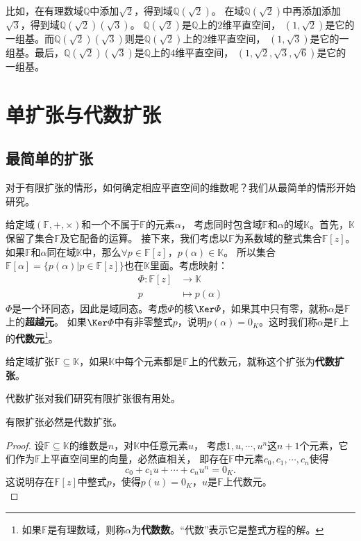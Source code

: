 \documentclass[12pt,UTF8]{ctexbook}
\begin{document}
\begin{appendix}
比如，在有理数域$\mathbb{Q}$中添加$\sqrt{2}$，得到域$\mathbb{Q}(\sqrt{2})$。
在域$\mathbb{Q}(\sqrt{2})$中再添加添加$\sqrt{3}$，得到域$\mathbb{Q}(\sqrt{2})(\sqrt{3})$。
$\mathbb{Q}(\sqrt{2})$是$\mathbb{Q}$上的$2$维平直空间，
$(1, \sqrt{2})$是它的一组基。而$\mathbb{Q}(\sqrt{2})(\sqrt{3})$则是$\mathbb{Q}(\sqrt{2})$上的$2$维平直空间，
$(1, \sqrt{3})$是它的一组基。最后，$\mathbb{Q}(\sqrt{2})(\sqrt{3})$是$\mathbb{Q}$上的$4$维平直空间，
$(1, \sqrt{2}, \sqrt{3},\sqrt{6})$是它的一组基。   

\section{单扩张与代数扩张}
\subsection{最简单的扩张}
对于有限扩张的情形，如何确定相应平直空间的维数呢？我们从最简单的情形开始研究。

给定域$(\mathbb{F}, +, \times)$和一个不属于$\mathbb{F}$的元素$\alpha$，
考虑同时包含域$\mathbb{F}$和$\alpha$的域$\mathbb{K}$。首先，$\mathbb{K}$保留了集合$\mathbb{F}$及它配备的运算。
接下来，我们考虑以$\mathbb{F}$为系数域的整式集合$\mathbb{F}[z]$。
如果$\mathbb{F}$和$\alpha$同在域$\mathbb{K}$中，那么$\forall p \in \mathbb{F}[z]$，$p(\alpha) \in \mathbb{K}$。
所以集合$\mathbb{F}[\alpha] = \{p(\alpha) | p \in \mathbb{F}[z]\}$也在$\mathbb{K}$里面。考虑映射：
\begin{align*}
    \varPhi : \mathbb{F}[z] &\rightarrow \mathbb{K}  \\
    p &\mapsto p(\alpha)  
\end{align*}
$\varPhi$是一个环同态，因此是域同态。考虑$\varPhi$的核$\Ker\varPhi$，如果其中只有零，就称$\alpha$是$\mathbb{F}$上的\textbf{超越元}。
如果$\Ker\varPhi$中有非零整式$p$，说明$p(\alpha) = 0_K$。这时我们称$\alpha$是$\mathbb{F}$上的\textbf{代数元}\footnote{如果$\mathbb{F}$是有理数域，则称$\alpha$为\textbf{代数数}。“代数”表示它是整式方程的解。}。
\begin{df}\label{df:9_0}
    给定域扩张$\mathbb{F} \subseteq \mathbb{K}$，如果$\mathbb{K}$中每个元素都是$\mathbb{F}$上的代数元，就称这个扩张为\textbf{代数扩张}。
\end{df}
代数扩张对我们研究有限扩张很有用处。
\begin{pp}\label{pp:9_0_1}
    有限扩张必然是代数扩张。
\end{pp}
\begin{proof} %
    设$\mathbb{F} \subseteq \mathbb{K}$的维数是$n$，对$\mathbb{K}$中任意元素$u$，
    考虑$1, u, \cdots, u^n$这$n+1$个元素，它们作为$\mathbb{F}$上平直空间里的向量，必然直相关，
    即存在$\mathbb{F}$中元素$c_0, c_1, \cdots , c_n$使得
    $$ c_0 + c_1 u + \cdots + c_n u^n = 0_K.$$
    这说明存在$\mathbb{F}[z]$中整式$p$，使得$p(u) = 0_K$，$u$是$\mathbb{F}$上代数元。\\
\end{proof}



\end{appendix}
\end{document}
